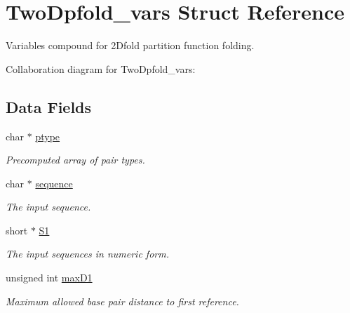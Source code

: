 \hypertarget{structTwoDpfold__vars}{}\section{Two\+Dpfold\+\_\+vars Struct Reference}
\label{structTwoDpfold__vars}


Variables compound for 2Dfold partition function folding.  




Collaboration diagram for Two\+Dpfold\+\_\+vars\+:
\subsection*{Data Fields}
\begin{DoxyCompactItemize}
\item 
\mbox{\label{structTwoDpfold__vars_a67f37b8901b8d0a049c216d4c6241b07}} 
char $\ast$ \mbox{\hyperlink{structTwoDpfold__vars_a67f37b8901b8d0a049c216d4c6241b07}{ptype}}
\begin{DoxyCompactList}\small\item\em Precomputed array of pair types. \end{DoxyCompactList}\item 
\mbox{\label{structTwoDpfold__vars_a32c15a1e31856588259556c9020f32c6}} 
char $\ast$ \mbox{\hyperlink{structTwoDpfold__vars_a32c15a1e31856588259556c9020f32c6}{sequence}}
\begin{DoxyCompactList}\small\item\em The input sequence. \end{DoxyCompactList}\item 
\mbox{\label{structTwoDpfold__vars_a240311ae1e8e121441651d6101e187ac}} 
short $\ast$ \mbox{\hyperlink{structTwoDpfold__vars_a240311ae1e8e121441651d6101e187ac}{S1}}
\begin{DoxyCompactList}\small\item\em The input sequences in numeric form. \end{DoxyCompactList}\item 
\mbox{\label{structTwoDpfold__vars_a7292b6cbc1ee5bacf55e842f316c4bef}} 
unsigned int \mbox{\hyperlink{structTwoDpfold__vars_a7292b6cbc1ee5bacf55e842f316c4bef}{max\+D1}}
\begin{DoxyCompactList}\small\item\em Maximum allowed base pair distance to first reference. \end{DoxyCompactList}\item 

\end{DoxyCompactItemize}
